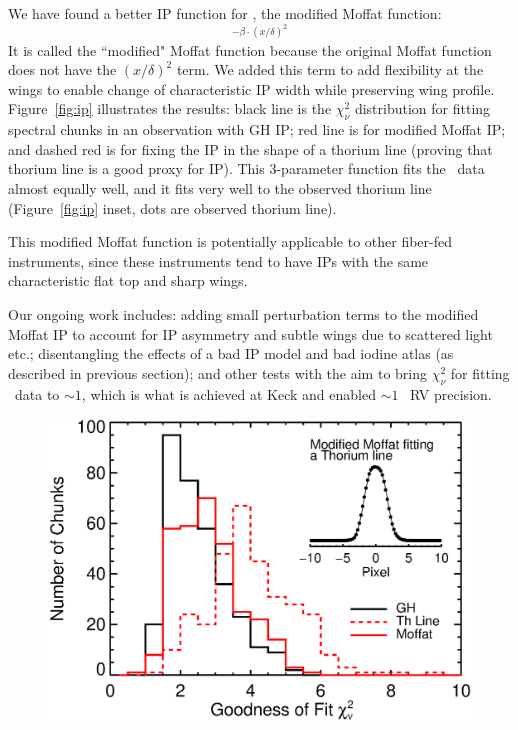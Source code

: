 We have found a better IP function for \hrs, the modified Moffat function:
\begin{equation}
[1+(x/\theta)^2]^{-\beta\cdot(x/\delta)^2}
\end{equation} 
It is called the ``modified" Moffat function because the original
Moffat function does not have the $(x/\delta)^2$ term. We added this
term to add flexibility at the wings to enable change of characteristic
IP width while preserving wing profile. Figure~\ref{fig:ip}
illustrates the results: black line is the $\chi^2_\nu$ distribution
for fitting spectral chunks in an observation with GH IP; red line is
for modified Moffat IP; and dashed red is for fixing the IP in the
shape of a thorium line (proving that thorium line is a good proxy for
IP). This 3-parameter function fits the \hrs\ data almost equally
well, and it fits very well to the observed thorium line
(Figure~\ref{fig:ip} inset, dots are observed thorium line).

This modified Moffat function is potentially applicable to other
fiber-fed instruments, since these instruments tend to have IPs with
the same characteristic flat top and sharp wings.

Our ongoing work includes: adding small perturbation terms to the
modified Moffat IP to account for IP asymmetry and subtle wings due to
scattered light etc.; disentangling the effects of a bad IP model and
bad iodine atlas (as described in previous section); and other tests
with the aim to bring $\chi^2_\nu$ for fitting \hrs\ data to $\sim 1$,
which is what is achieved at Keck and enabled $\sim 1$ \mps\ RV
precision.


\begin{figure}
\centering
\includegraphics[scale=0.45]{het/thar_vs_moffat.eps}
\caption{
\label{het:fig:moffat}}
\end{figure}






